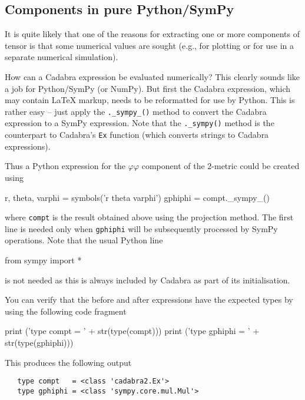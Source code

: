 \documentclass[a4paper,12pt]{article}
\numberwithin{equation}{section}%
\begin{document}
\subsection{Components in pure Python/SymPy}

It is quite likely that one of the reasons for extracting one or more components of tensor
is that some numerical values are sought (e.g., for plotting or for use in a separate
numerical simulation).

How can a Cadabra expression be evaluated numerically? This clearly sounds like a job for
Python/SymPy (or NumPy). But first the Cadabra expression, which may contain LaTeX markup,
needs to be reformatted for use by Python. This is rather easy -- just apply the
\verb|._sympy_()| method to convert the Cadabra expression to a SymPy expression. Note that
the \verb|._sympy()| method is the counterpart to Cadabra's \verb|Ex| function (which
converts strings to Cadabra expressions).

Thus a Python expression for the $\varphi\varphi$ component of the 2-metric could be created
using
\begin{cadabra}[numbers=none]
   r, theta, varphi = symbols('r theta varphi')
   gphiphi = compt._sympy_()
\end{cadabra}
where \verb|compt| is the result obtained above using the projection method. The first line
is needed only when \verb|gphiphi| will be subsequently processed by SymPy operations. Note
that the usual Python line
\goodbreak
\begin{cadabra}[numbers=none]
   from sympy import *
\end{cadabra}
is not needed as this is always included by Cadabra as part of its initialisation.

You can verify that the before and after expressions have the expected types by using the
following code fragment
\begin{cadabra}[numbers=none]
   print ('type compt   = ' + str(type(compt)))
   print ('type gphiphi = ' + str(type(gphiphi)))
\end{cadabra}
This produces the following output
\bgroup
\lstset{numbers=none}
\begin{lstlisting}
   type compt   = <class 'cadabra2.Ex'>
   type gphiphi = <class 'sympy.core.mul.Mul'>
\end{lstlisting}
\egroup

\end{document}
